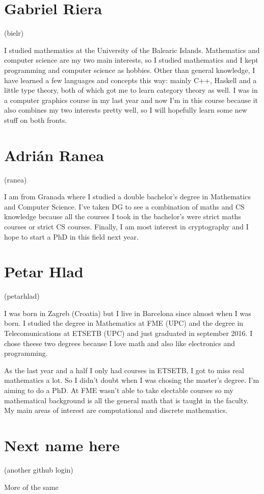 \documentclass[11pt]{amsart}
\begin{document}
\medskip

\section*{Gabriel Riera}
(bielr)

I studied mathematics at the University of the Balearic Islands. Mathematics
and computer science are my two main interests, so I studied mathematics and I
kept programming and computer science as hobbies. Other than general knowledge,
I have learned a few languages and concepts this way: mainly C++, Haskell and a
little type theory, both of which got me to learn category theory as well. I
was in a computer graphics course in my last year and now I'm in this course
because it also combines my two interests pretty well, so I will hopefully
learn some new stuff on both fronts.

\medskip

\section*{Adrián Ranea}
(ranea)

I am from Granada where I studied a double bachelor's degree in Mathematics and Computer Science. I've taken DG to see a combination of maths and CS knowledge because all the courses I took in the bachelor's were strict maths courses or strict CS courses. Finally, I am most interest in cryptography and I hope to start a PhD in this field next year.

\medskip

\section*{Petar Hlad}
(petarhlad)

I was born in Zagreb (Croatia) but I live in Barcelona since almost when I was born. I studied the degree in Mathematics at FME (UPC) and the degree in Telecomunications at ETSETB (UPC) and just graduated in september 2016. I chose theese two degrees because I love math and also like electronics and programming.

As the last year and a half I only had courses in ETSETB, I got to miss real mathematics a lot. So I didn't doubt when I was chosing the master's degree. I'm aiming to do a PhD.
At FME wasn't able to take electable courses so my mathematical background is all the general math that is taught in the faculty. My main areas of interest are computational and discrete mathematics.

\medskip

\section*{Next name here}
(another github login)

More of the same
\end{document}
